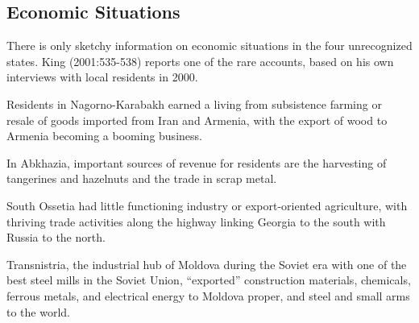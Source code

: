 \documentclass[12pt,a4paper]{article}%
\begin{document}
\subsection{Economic Situations}\label{economic}
There is only sketchy information on economic situations in the four unrecognized states. King (2001:535-538) reports one of the rare accounts, based on his own interviews with local residents in 2000. 

Residents in Nagorno-Karabakh earned a living from subsistence farming or resale of goods imported from Iran and Armenia, with the export of wood to Armenia becoming a booming business. 

In Abkhazia, important sources of revenue for residents are the harvesting of tangerines and hazelnuts and the trade in scrap metal. 

South Ossetia had little functioning industry or export-oriented agriculture, with thriving trade activities along the highway linking Georgia to the south with Russia to the north. 

Transnistria, the industrial hub of Moldova during the Soviet era with one of the best steel mills in the Soviet Union, ``exported'' construction materials, chemicals, ferrous metals, and electrical energy to Moldova proper, and steel and small arms to the world.


\end{document}
